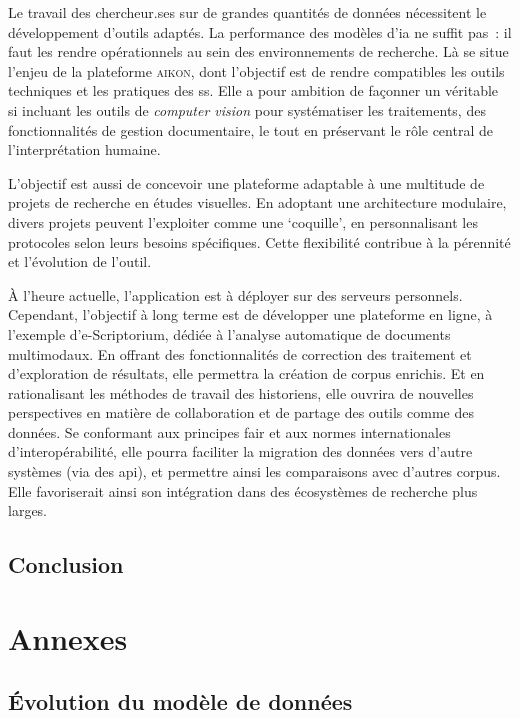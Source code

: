 \documentclass[a4paper,12pt,twoside]{book}
\newcommand{\fair}{\gls{fair}\xspace}
\newcommand{\api}{\gls{api}\xspace}
\newcommand{\aikon}{\textsc{aikon}\xspace}
\newcommand{\cv}{\emph{computer vision}\xspace}
\newcommand{\ia}{\gls{ia}\xspace}
\newcommand{\si}{\gls{si}\xspace}
\newcommand{\clearemptydoublepage}{\newpage{\pagestyle{empty}\cleardoublepage}}
\newcommand\chapterNo[1]{%
 \chapter*{#1}
  \markboth{}{} %
  \markright{\MakeUppercase{#1}}
}
\begin{document}
Le travail des chercheur.ses sur de grandes quantités de données
nécessitent le développement d'outils adaptés. La performance des
modèles d'\ia ne suffit pas~: il faut les rendre opérationnels au sein
des environnements de recherche. Là se situe l'enjeu de la plateforme
\aikon, dont l'objectif est de rendre compatibles les outils techniques
et les pratiques des ss. Elle a pour ambition de façonner un
véritable \si incluant les outils de \cv pour
systématiser les traitements, des fonctionnalités de gestion
documentaire, le tout en préservant le rôle central de l'interprétation
humaine.

L'objectif est aussi de concevoir une plateforme adaptable à une
multitude de projets de recherche en études visuelles. En adoptant une
architecture modulaire, divers projets peuvent l'exploiter comme une
`coquille', en personnalisant les protocoles selon leurs besoins
spécifiques. Cette flexibilité contribue à la pérennité et l'évolution
de l'outil.

À l'heure actuelle, l'application est à déployer sur des serveurs
personnels. Cependant, l'objectif à long terme est de développer une
plateforme en ligne, à l'exemple d'e-Scriptorium, dédiée à l'analyse
automatique de documents multimodaux. En offrant des fonctionnalités de
correction des traitement et d'exploration de résultats, elle permettra
la création de corpus enrichis. Et en rationalisant les méthodes de
travail des historiens, elle ouvrira de nouvelles perspectives en
matière de collaboration et de partage des outils comme des données. Se
conformant aux principes \fair et aux normes internationales d'interopérabilité, elle pourra faciliter la migration des données vers
d'autre systèmes (via des \api), et permettre ainsi les
comparaisons avec d'autres corpus. Elle favoriserait ainsi son intégration
dans des écosystèmes de recherche plus larges.

\clearemptydoublepage
    
    \chapterNo{Conclusion}
    
    

\appendix
    \part*{Annexes}	
    
    \chapter[Évolution du modèle de données]{\label{data_models}Évolution du modèle de données}
	    
	    \clearemptydoublepage
	
\end{document}
